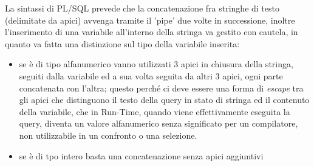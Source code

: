 La sintassi di PL/SQL prevede che la concatenazione fra stringhe di testo (delimitate da apici) avvenga tramite il 'pipe' due volte in successione, inoltre l'inserimento di una variabile all'interno della stringa va gestito con cautela, in quanto va fatta una distinzione sul tipo della variabile inserita: \\
\begin{itemize}
\item se è di tipo alfanumerico vanno utilizzati 3 apici in chiusura della stringa, seguiti dalla variabile ed a sua volta seguita da altri 3 apici, ogni parte concatenata con l'altra; questo perché ci deve essere una forma di \textit{escape} tra gli apici che distinguono il testo della query in stato di stringa ed il contenuto della variabile, che in Run-Time, quando viene effettivamente eseguita la query, diventa un valore alfanumerico senza significato per un compilatore, non utilizzabile in un confronto o una selezione.\\
\item se è di tpo intero basta una concatenazione senza apici aggiuntivi
\end{itemize}

